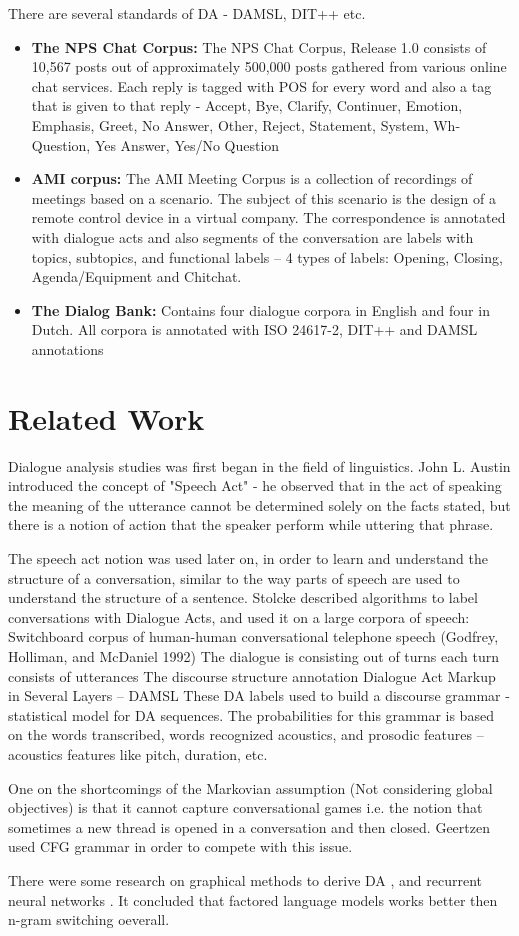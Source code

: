There are several standards of DA - DAMSL, DIT++ etc. 
\begin{itemize}
	\item {\bf The NPS Chat Corpus:} The NPS Chat Corpus, Release 1.0 consists of 10,567 posts out of approximately 500,000 posts gathered from various online chat services.
Each reply is tagged with POS for every word and also a tag that is given to that reply - Accept, Bye, Clarify, Continuer, Emotion, Emphasis, Greet, No Answer, Other, Reject, Statement, System, Wh-Question, Yes Answer, Yes/No Question
	\item {\bf AMI corpus:} The AMI Meeting Corpus is a collection of recordings of meetings based on a scenario. The subject of this scenario is the design of a remote control device in a virtual company.
The correspondence is annotated with dialogue acts and also segments of the conversation are labels with topics, subtopics, and functional labels – 4 types of labels: Opening, Closing, Agenda/Equipment and Chitchat.

	\item {\bf The Dialog Bank:} Contains four dialogue corpora in English and four in Dutch. All corpora is annotated with ISO 24617-2, DIT++ and DAMSL annotations
\end{itemize}

\section{Related Work}
Dialogue analysis studies was first began in the field of linguistics.
John L. Austin introduced the concept of "Speech Act" - he observed that in the act of speaking the meaning of the utterance cannot be determined solely on the facts stated, but there is a notion of action that the speaker perform while uttering that phrase.

The speech act notion was used later on, in order to learn and understand the structure of a conversation, similar to the way parts of speech are used to understand the structure of a sentence. Stolcke \cite{cs-CL-0006023} described algorithms to label conversations with Dialogue Acts, and used it on a large corpora of speech: Switchboard corpus of human-human conversational telephone speech (Godfrey, Holliman, and McDaniel 1992)
The dialogue is consisting out of turns each turn consists of utterances
The discourse structure annotation Dialogue Act Markup in Several Layers – DAMSL
These DA labels used to build a discourse grammar - statistical model for DA sequences.
The probabilities for this grammar is based on the words transcribed, words recognized acoustics, and prosodic features – acoustics features like pitch, duration, etc.

One on the shortcomings of the Markovian assumption (Not considering global objectives) is that it cannot capture conversational games i.e. the notion that sometimes a new thread is opened in a conversation and then closed. Geertzen \cite{Geertzen} used CFG grammar in order to compete with this issue.

There were some research on graphical methods to derive DA \cite{DBLP:conf/icassp/2005}, and recurrent neural networks \cite{DBLP:conf/coling/1996}. It concluded that factored language models works better then n-gram switching oeverall.